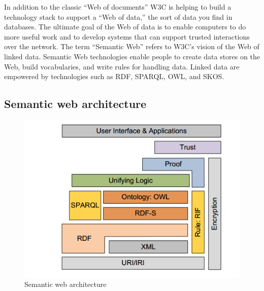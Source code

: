\documentclass[a4paper,12pt,oneside]{report}
\begin{document}
{{      In addition to the classic “Web of documents” W3C is helping to build a technology stack to support a “Web of data,” the sort of data you find in databases. The ultimate goal of the Web of data is to enable computers to do more useful work and to develop systems that can support trusted interactions over the network. The term “Semantic Web” refers to W3C’s vision of the Web of linked data. Semantic Web technologies enable people to create data stores on the Web, build vocabularies, and write rules for handling data. Linked data are empowered by technologies such as RDF, SPARQL, OWL, and SKOS.}
\subsection{Semantic web architecture}
\begin{figure}[ht]
\centering
\includegraphics[width=1\textwidth]{Capture0}
\caption{Semantic web architecture}
\end{figure}
}
\end{document}
